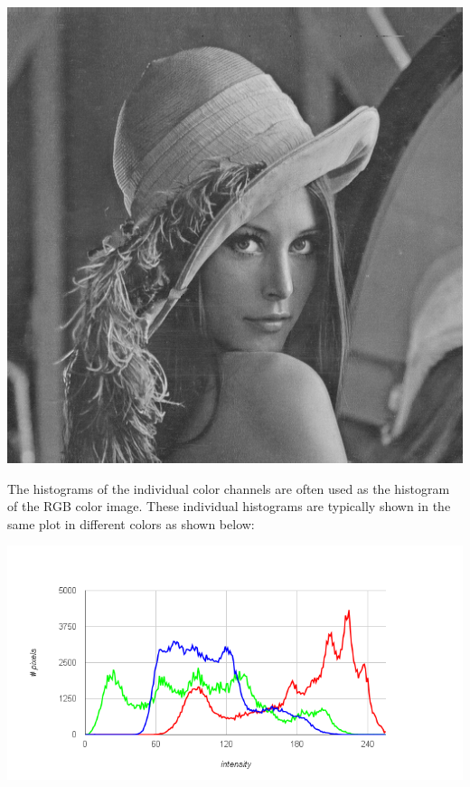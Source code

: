\documentclass{book}
\begin{document}
\begin{center}
\includegraphics[scale=0.2]{lena-blue.png}
\end{center}
The histograms of the individual color channels are often used as the histogram of the RGB color image. These individual histograms are typically shown in the same plot in different colors as shown below:
\begin{center}
\includegraphics[scale=0.5]{lena-histogram.png}
\end{center}
\end{document}
